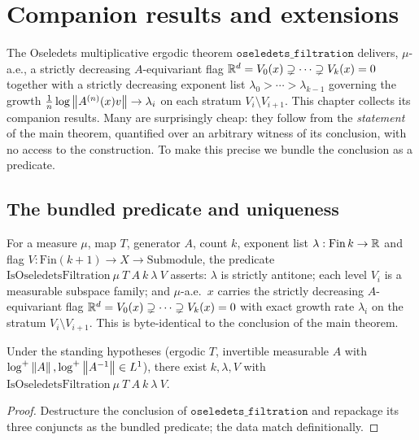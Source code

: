 \chapter{Companion results and extensions}
\label{chap:corollaries}

The Oseledets multiplicative ergodic theorem $\texttt{oseledets\_filtration}$ delivers, $\mu$-a.e., a strictly decreasing $A$-equivariant flag $\mathbb{R}^d = V_0(x) \supsetneq \cdots \supsetneq V_k(x) = 0$ together with a strictly decreasing exponent list $\lambda_0 > \cdots > \lambda_{k-1}$ governing the growth $\tfrac1n \log\left\lVert A^{(n)}(x)v \right\rVert \to \lambda_i$ on each stratum $V_i \setminus V_{i+1}$. This chapter collects its companion results. Many are surprisingly cheap: they follow from the \emph{statement} of the main theorem, quantified over an arbitrary witness of its conclusion, with no access to the construction. To make this precise we bundle the conclusion as a predicate.

\section{The bundled predicate and uniqueness}

\begin{definition}\label{IsOseledetsFiltration}
  \leanok
  For a measure $\mu$, map $T$, generator $A$, count $k$, exponent list $\lambda : \mathrm{Fin}\,k \to \mathbb{R}$ and flag $V : \mathrm{Fin}(k+1) \to X \to \mathrm{Submodule}$, the predicate $\mathrm{IsOseledetsFiltration}\ \mu\ T\ A\ k\ \lambda\ V$ asserts: $\lambda$ is strictly antitone; each level $V_i$ is a measurable subspace family; and $\mu$-a.e.\ $x$ carries the strictly decreasing $A$-equivariant flag $\mathbb{R}^d = V_0(x) \supsetneq \cdots \supsetneq V_k(x) = 0$ with exact growth rate $\lambda_i$ on the stratum $V_i \setminus V_{i+1}$. This is byte-identical to the conclusion of the main theorem.
\end{definition}

\begin{theorem}\label{oseledets_filtration'}
  \leanok
  Under the standing hypotheses (ergodic $T$, invertible measurable $A$ with $\log^+\left\lVert A \right\rVert, \log^+\left\lVert A^{-1} \right\rVert \in L^1$), there exist $k, \lambda, V$ with $\mathrm{IsOseledetsFiltration}\ \mu\ T\ A\ k\ \lambda\ V$.
\end{theorem}
\begin{proof}\leanok
  Destructure the conclusion of $\texttt{oseledets\_filtration}$ and repackage its three conjuncts as the bundled predicate; the data match definitionally.
\end{proof}

